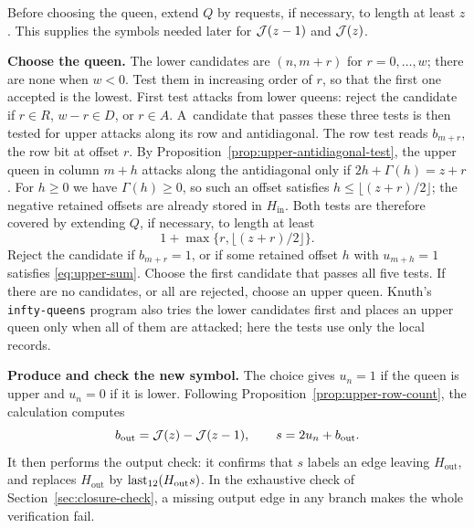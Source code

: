 Before choosing the queen, extend $Q$ by requests, if necessary, to
length at least $z$. This supplies the symbols needed later for
$\mathcal J(z-1)$ and $\mathcal J(z)$.

\medskip\noindent
\textbf{Choose the queen.}
The lower candidates are $(n,m+r)$ for $r=0,\dots,w$; there are none
when $w<0$. Test them in increasing order of $r$, so that the first
one accepted is the lowest. First test attacks from lower queens:
reject the candidate if $r\in R$, $w-r\in D$, or $r\in A$. 
A~candidate that passes these three tests is then tested for upper
attacks along its row and antidiagonal. The row test reads
$b_{m+r}$, the row bit at offset $r$. By
Proposition~\ref{prop:upper-antidiagonal-test}, the upper queen in
column $m+h$ attacks along the antidiagonal only if
$2h+\Gamma(h)=z+r$. For $h\ge0$ we have $\Gamma(h)\ge0$, so such an
offset satisfies $h\le\lfloor(z+r)/2\rfloor$; the negative retained
offsets are already stored in $H_{\mathrm{in}}$. Both tests are
therefore covered by extending $Q$, if necessary, to length at least
\[
 1+\max\{r,\lfloor(z+r)/2\rfloor\}.
\]
Reject the candidate if $b_{m+r}=1$, or if some retained offset $h$
with $u_{m+h}=1$ satisfies \eqref{eq:upper-sum}. Choose the first
candidate that passes all five tests. If there are no candidates, or
all are rejected, choose an upper queen. Knuth's \texttt{infty-queens} program \cite{KnuthQueens} also tries
the lower candidates first and places an upper queen only when all of
them are attacked; here the tests use only the local records.

\medskip\noindent
\textbf{Produce and check the new symbol.}
The choice gives $u_n=1$ if the queen is upper and $u_n=0$ if it is
lower. Following Proposition~\ref{prop:upper-row-count}, the
calculation computes
\begin{equation}\label{eq:output}
 b_{\mathrm{out}}=\mathcal J(z)-\mathcal J(z-1),\qquad
 s=2u_n+b_{\mathrm{out}}.
\end{equation}
It then performs the output check: it confirms that $s$ labels an
edge leaving $H_{\mathrm{out}}$, and
replaces $H_{\mathrm{out}}$ by $\operatorname{last}_{12}(H_{\mathrm{out}}s)$. In the
exhaustive check of Section~\ref{sec:closure-check}, a missing output edge in any
branch makes the whole verification fail.

